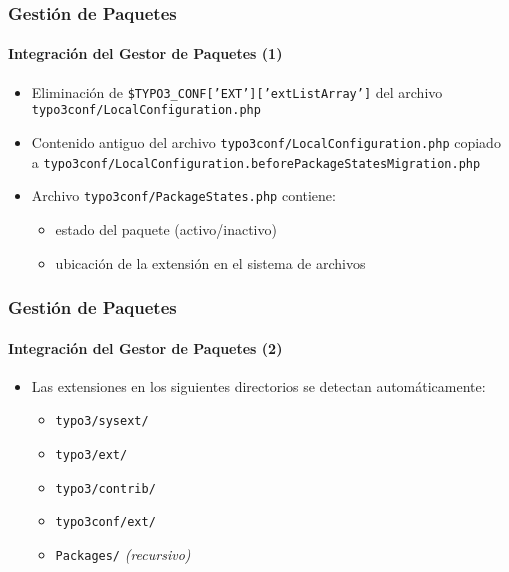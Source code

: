 
\begin{frame}[fragile]
	\frametitle{Gestión de Paquetes}
	\framesubtitle{Integración del Gestor de Paquetes (1)}

	\begin{itemize}
		\item Eliminación de \texttt{\$TYPO3\_CONF['EXT']['extListArray']} del archivo \newline
			\smaller\texttt{typo3conf/LocalConfiguration.php}\normalsize

		\item Contenido antiguo del archivo \small\texttt{typo3conf/LocalConfiguration.php} copiado a\normalsize\newline
			\smaller\texttt{typo3conf/LocalConfiguration.beforePackageStatesMigration.php}\normalsize

		\item Archivo \texttt{typo3conf/PackageStates.php} contiene:

			\begin{itemize}
				\item estado del paquete (activo/inactivo)
				\item ubicación de la extensión en el sistema de archivos
			\end{itemize}
	\end{itemize}
\end{frame}


\begin{frame}[fragile]
	\frametitle{Gestión de Paquetes}
	\framesubtitle{Integración del Gestor de Paquetes (2)}

	\begin{itemize}
		\item Las extensiones en los siguientes directorios se detectan automáticamente:

			\begin{itemize}
				\item \texttt{typo3/sysext/}
				\item \texttt{typo3/ext/}
				\item \texttt{typo3/contrib/}
				\item \texttt{typo3conf/ext/}
				\item \texttt{Packages/} \emph{(recursivo)}
			\end{itemize}
	\end{itemize}
\end{frame}

